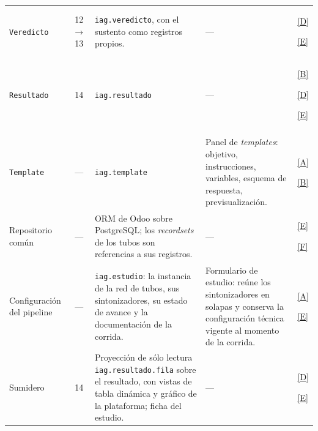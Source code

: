\documentclass[12pt]{report}
\DeclareRobustCommand{\resp}[1]{\hyperref[tab:registro-responsabilidades]{\textcolor{respcolor}{[#1]}}}
\begin{document}
{\begin{xltabular}{\textwidth}{@{}>{\raggedright\arraybackslash}p{2.3cm} c >{\raggedright\arraybackslash}p{4.8cm} >{\raggedright\arraybackslash}X >{\centering\arraybackslash}p{0.75cm}@{}}
      \texttt{Veredicto} & 12$\to$13 & \texttt{iag.veredicto}, con el sustento como registros propios. & --- & \resp{D}\par\resp{E}\\
      \texttt{Resultado} & 14 & \texttt{iag.resultado} & --- & \resp{B}\par\resp{D}\par\resp{E}\\
      \addlinespace[4pt]
       \\
      \addlinespace[2pt]
      \texttt{Template} & --- & \texttt{iag.template} & Panel de \textit{templates}: objetivo, instrucciones, variables, esquema de respuesta, previsualización. & \resp{A}\par\resp{B}\\
      \addlinespace
      Repositorio común & --- & ORM de Odoo sobre PostgreSQL; los \textit{recordsets} de los tubos son referencias a sus registros. & --- & \resp{E}\par\resp{F}\\
      \addlinespace
      Configuración del pipeline & --- & \texttt{iag.estudio}: la instancia de la red de tubos, sus sintonizadores, su estado de avance y la documentación de la corrida. & Formulario de estudio: reúne los sintonizadores en solapas y conserva la configuración técnica vigente al momento de la corrida. & \resp{A}\par\resp{E}\\
      \addlinespace
      Sumidero & 14 & Proyección de sólo lectura \texttt{iag.resultado.fila} sobre el resultado, con vistas de tabla dinámica y gráfico de la plataforma; ficha del estudio. & --- & \resp{D}\par\resp{E}\\
    \end{xltabular}
  }
\end{document}
